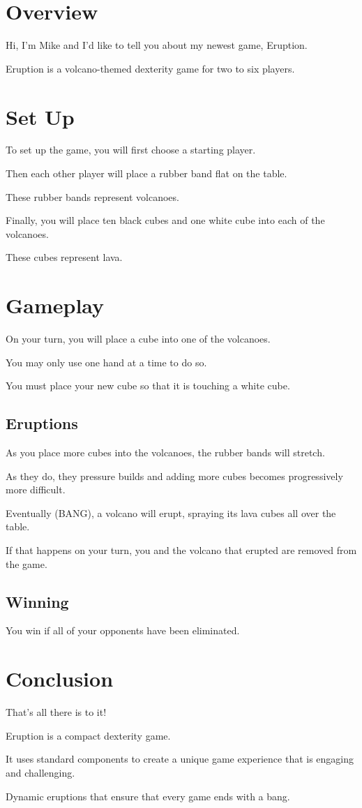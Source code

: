 \documentclass[DIV=18,parskip=half, a4paper]{scrartcl}
\begin{document}
\section*{Overview}
Hi, I'm Mike and I'd like to tell you about my newest game, Eruption. 

Eruption is a volcano-themed dexterity game for two to six players.

\section*{Set Up}
To set up the game, you will first choose a starting player.

Then each other player will place a rubber band flat on the table.

These rubber bands represent volcanoes.

Finally, you will place ten black cubes and one white cube into each of the volcanoes.

These cubes represent lava.

\section*{Gameplay}
On your turn, you will place a cube into one of the volcanoes.

You may only use one hand at a time to do so.

You must place your new cube so that it is touching a white cube.

\subsection*{Eruptions}
As you place more cubes into the volcanoes, the rubber bands will stretch.

As they do, they pressure builds and adding more cubes becomes progressively more difficult.

Eventually (BANG), a volcano will erupt, spraying its lava cubes all over the table.

If that happens on your turn, you and the volcano that erupted are removed from the game.

\subsection*{Winning}
You win if all of your opponents have been eliminated.


\section*{Conclusion}
That's all there is to it! 

Eruption is a compact dexterity game.

It uses standard components to create a unique game experience that is engaging and challenging.

Dynamic eruptions that ensure that every game ends with a bang.
\end{document}
